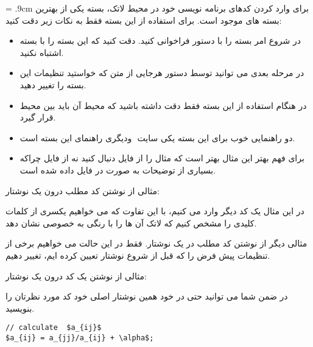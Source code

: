 \documentclass{report}
\begin{document}
\baselineskip = .9cm
برای وارد کردن کدهای برنامه نویسی خود در محیط لاتک، بسته  یکی از بهترین بسته های موجود است. برای استفاده از این بسته فقط به نکات زیر دقت کنید:
\begin{itemize}
\item
در شروع امر بسته  را  با دستور  فراخوانی کنید. دقت کنید که این بسته را با بسته  اشتباه نکنید.
\item
در مرحله بعدی می توانید توسط دستور  هرجایی از متن که خواستید تنظیمات این بسته را تغییر دهید. 
\item
در هنگام استفاده از این بسته فقط دقت داشته باشید که محیط آن باید بین محیط ‌قرار گیرد. 
\item
دو راهنمایی خوب برای این بسته یکی سایت ‌ ودیگری راهنمای این بسته است. 
\item
برای فهم بهتر این مثال بهتر است که مثال را از فایل  دنبال کنید نه از فایل  چراکه بسیاری از توضیحات به صورت  در فایل  داده شده است. 
\end{itemize}


مثالی از نوشتن کد مطلب درون یک نوشتار:

\begin{latin}

\end{latin}

در این مثال یک کد  دیگر وارد می کنیم، با این تفاوت که می خواهیم یکسری از کلمات کلیدی را مشخص کنیم که لاتک آن ها را با رنگی به خصوصی نشان دهد. 
\begin{latin}

\end{latin}

مثالی دیگر از نوشتن کد مطلب در یک نوشتار. فقط در این حالت می خواهیم برخی از تنظیمات پیش فرض را که قبل از شروع نوشتار تعیین کرده ایم، تغییر دهیم. 
\begin{latin}

\end{latin}

مثالی از نوشتن یک کد {} درون یک نوشتار:

\begin{latin}

\end{latin}


در ضمن شما می توانید حتی در خود همین نوشتار اصلی خود کد مورد نظرتان را بنویسید. 
\begin{latin}
\begin{lstlisting}[mathescape=true]
// calculate  $a_{ij}$
$a_{ij} = a_{jj}/a_{ij} + \alpha$;
\end{lstlisting}
\end{latin}
\end{document}
